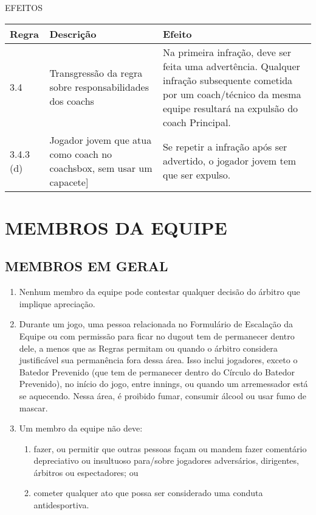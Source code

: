 EFEITOS

{\footnotesize\begin{tabular}{p{20mm}p{50mm}p{90mm}}
		Regra& Descrição & Efeito\\\hline
		3.4 & Transgressão da regra sobre responsabilidades dos \glspl{coach} &
		Na primeira infração, deve ser feita uma advertência. Qualquer infração subsequente cometida por um \gls{coach}/técnico da mesma equipe resultará na  expulsão do \gls{coach} Principal.\\[4mm]

		3.4.3 (d) & Jogador jovem que atua como \gls{coach} no \gls{coachsbox}, sem usar um capacete] & Se repetir a infração após ser advertido, o jogador jovem tem que ser expulso.
\end{tabular}}


\section{MEMBROS DA EQUIPE}
\subsection{MEMBROS EM GERAL}
\begin{enumerate}[label=(\alph*)]
	\item Nenhum membro da equipe pode contestar qualquer decisão do árbitro que implique apreciação.
	\item Durante um jogo, uma pessoa relacionada no Formulário de Escalação da Equipe ou com permissão para ficar no \gls{dugout} tem de permanecer dentro dele, a menos que as Regras permitam ou quando o árbitro considera justificável sua  permanência fora dessa área. Isso inclui jogadores, exceto o Batedor Prevenido (que tem de permanecer dentro do Círculo do Batedor Prevenido), no início do jogo, entre \glspl{inning}, ou quando um arremessador está se aquecendo. Nessa área, é proibido fumar, consumir álcool ou usar fumo de mascar.
	\item Um membro da equipe não deve:
	\begin{enumerate}[label=\roman*.]
		\item fazer, ou permitir que outras pessoas façam ou mandem fazer comentário depreciativo ou insultuoso para/sobre jogadores adversários, dirigentes, árbitros  ou espectadores; ou
		\item cometer qualquer ato que possa ser considerado uma conduta antidesportiva.
	\end{enumerate}
\end{enumerate}


